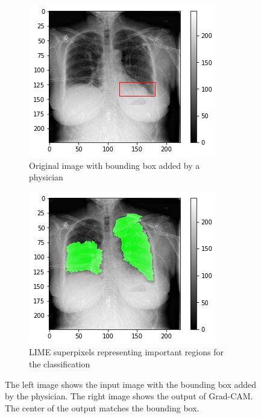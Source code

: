 \begin{figure}[H]
    \centering
    \begin{subfigure}[t]{.45\textwidth}
        \centering
        \includegraphics[width=\linewidth]{chapters/03_classification/images/rise1_bbox.png}
        \caption{Original image with bounding box added by a physician}
    \end{subfigure}\hspace{1cm}%
    \begin{subfigure}[t]{.45\textwidth}
        \centering
        \includegraphics[width=\linewidth]{chapters/03_classification/images/lime_2.png}
        \caption{LIME superpixels representing important regions for the classification}
    \end{subfigure}
    \caption{The left image shows the input image with the bounding box added by the physician. The right image shows the output of Grad-CAM. The center of the output matches the bounding box.}
\label{grad_cam_example_3}
\end{figure}

